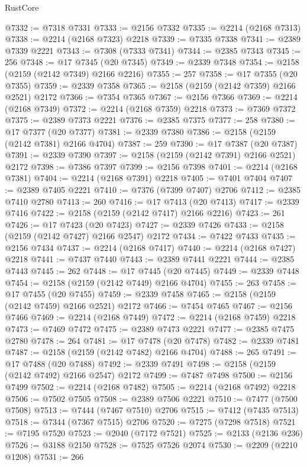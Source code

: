 \begin{lexlean}{RustCore}
\begin{coremodule}
@7332 := @7318 @7331
@7333 := @2156 @7332
@7335 := @2214 (@2168 @7313)
@7338 := @2214 (@2168 @7323) @2218
@7339 := @7335 @7338
@7341 := @2389 @7339 @2221
@7343 := @7308 (@7333 @7341)
@7344 := @2385 @7343
@7345 := 256
@7348 := @17 @7345 (@20 @7345)
@7349 := @2339 @7348
@7354 := @2158 (@2159 (@2142 @7349) @2166 @2216)
@7355 := 257
@7358 := @17 @7355 (@20 @7355)
@7359 := @2339 @7358
@7365 := @2158 (@2159 (@2142 @7359) @2166 @2521) @2172
@7366 := @7354 @7365
@7367 := @2156 @7366
@7369 := @2214 (@2168 @7349)
@7372 := @2214 (@2168 @7359) @2218
@7373 := @7369 @7372
@7375 := @2389 @7373 @2221
@7376 := @2385 @7375
@7377 := 258
@7380 := @17 @7377 (@20 @7377)
@7381 := @2339 @7380
@7386 := @2158 (@2159 (@2142 @7381) @2166 @4704)
@7387 := 259
@7390 := @17 @7387 (@20 @7387)
@7391 := @2339 @7390
@7397 := @2158 (@2159 (@2142 @7391) @2166 @2521) @2172
@7398 := @7386 @7397
@7399 := @2156 @7398
@7401 := @2214 (@2168 @7381)
@7404 := @2214 (@2168 @7391) @2218
@7405 := @7401 @7404
@7407 := @2389 @7405 @2221
@7410 := @7376 (@7399 @7407) @2706
@7412 := @2385 @7410 @2780
@7413 := 260
@7416 := @17 @7413 (@20 @7413)
@7417 := @2339 @7416
@7422 := @2158 (@2159 (@2142 @7417) @2166 @2216)
@7423 := 261
@7426 := @17 @7423 (@20 @7423)
@7427 := @2339 @7426
@7433 := @2158 (@2159 (@2142 @7427) @2166 @2547) @2172
@7434 := @7422 @7433
@7435 := @2156 @7434
@7437 := @2214 (@2168 @7417)
@7440 := @2214 (@2168 @7427) @2218
@7441 := @7437 @7440
@7443 := @2389 @7441 @2221
@7444 := @2385 @7443
@7445 := 262
@7448 := @17 @7445 (@20 @7445)
@7449 := @2339 @7448
@7454 := @2158 (@2159 (@2142 @7449) @2166 @4704)
@7455 := 263
@7458 := @17 @7455 (@20 @7455)
@7459 := @2339 @7458
@7465 := @2158 (@2159 (@2142 @7459) @2166 @2521) @2172
@7466 := @7454 @7465
@7467 := @2156 @7466
@7469 := @2214 (@2168 @7449)
@7472 := @2214 (@2168 @7459) @2218
@7473 := @7469 @7472
@7475 := @2389 @7473 @2221
@7477 := @2385 @7475 @2780
@7478 := 264
@7481 := @17 @7478 (@20 @7478)
@7482 := @2339 @7481
@7487 := @2158 (@2159 (@2142 @7482) @2166 @4704)
@7488 := 265
@7491 := @17 @7488 (@20 @7488)
@7492 := @2339 @7491
@7498 := @2158 (@2159 (@2142 @7492) @2166 @2547) @2172
@7499 := @7487 @7498
@7500 := @2156 @7499
@7502 := @2214 (@2168 @7482)
@7505 := @2214 (@2168 @7492) @2218
@7506 := @7502 @7505
@7508 := @2389 @7506 @2221
@7510 := @7477 (@7500 @7508)
@7513 := @7444 (@7467 @7510) @2706
@7515 := @7412 (@7435 @7513)
@7518 := @7344 (@7367 @7515) @2706
@7520 := @7275 (@7298 @7518)
@7521 := @7195 @7520
@7523 := @2040 (@7172 @7521)
@7525 := @2133 (@2136 @236)
@7526 := @3188 @2150
@7528 := @7525 @7526 @2074
@7530 := @2209 (@2210 @1208)
@7531 := 266

\end{coremodule}
\end{lexlean}
